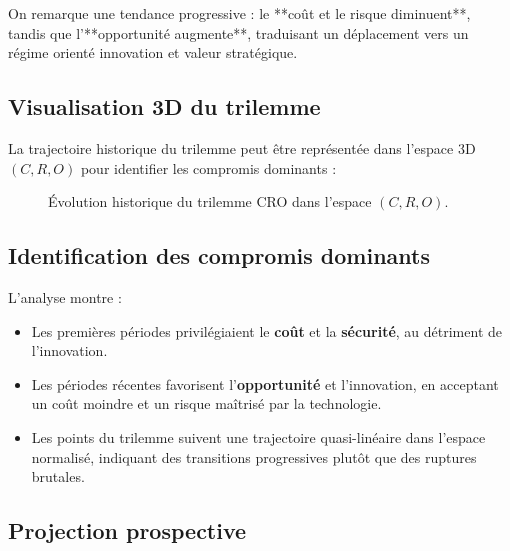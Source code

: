 \documentclass[12pt, a4em]{article}
\begin{document}
	On remarque une tendance progressive : le **coût et le risque diminuent**, tandis que l’**opportunité augmente**, traduisant un déplacement vers un régime orienté innovation et valeur stratégique.
	
	\subsection{ Visualisation 3D du trilemme}
	
	La trajectoire historique du trilemme peut être représentée dans l’espace 3D $(C,R,O)$ pour identifier les compromis dominants :
	
	\begin{figure}[h!]
		\centering
		\caption{Évolution historique du trilemme CRO dans l’espace $(C,R,O)$.}
	\end{figure}
	
	\subsection{ Identification des compromis dominants}
	
	L’analyse montre :
	\begin{itemize}
		\item Les premières périodes privilégiaient le \textbf{coût} et la \textbf{sécurité}, au détriment de l’innovation.  
		\item Les périodes récentes favorisent l’\textbf{opportunité} et l’innovation, en acceptant un coût moindre et un risque maîtrisé par la technologie.  
		\item Les points du trilemme suivent une trajectoire quasi-linéaire dans l’espace normalisé, indiquant des transitions progressives plutôt que des ruptures brutales.
	\end{itemize}
	
	\subsection{ Projection prospective}
	
\end{document}
